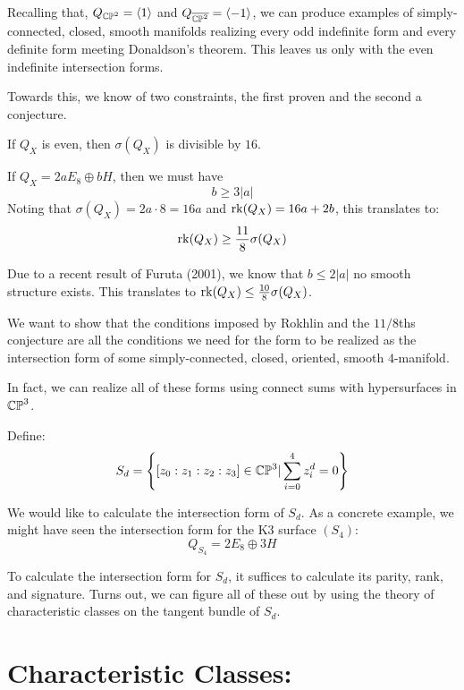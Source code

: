 \documentclass[12pt]{article}
\begin{document}
Recalling that, $Q_{\mathbb{CP}^2} = \langle 1 \rangle$ and $Q_{\overline{\mathbb{CP}^2}} = \langle -1 \rangle$, we can produce examples of simply-connected, closed, smooth manifolds realizing every odd indefinite form and every definite form meeting Donaldson's theorem. This leaves us only with the even indefinite intersection forms. 

Towards this, we know of two constraints, the first proven and the second a conjecture. 
\begin{theorem}[Rokhlin, '52]
    If $Q_X$ is even, then $\sigma(Q_X)$ is divisible by $16$.
\end{theorem}

\begin{theorem}[11/8-Conjecture]
    If $Q_X = 2aE_8 \oplus bH$, then we must have 
    \[ b \geq 3|a| \]
    Noting that $\sigma(Q_X) = 2a \cdot 8 = 16a$ and $\operatorname{rk}(Q_X) = 16a + 2b$, this translates to:
    \[ \operatorname{rk}(Q_X) \geq \frac{11}{8} \sigma(Q_X)\]
\end{theorem}
\begin{remark}
    Due to a recent result of Furuta (2001), we know that $b \leq 2|a|$ no smooth structure exists. This translates to $\operatorname{rk}(Q_X) \leq \frac{10}{8}\sigma(Q_X)$. 
\end{remark}

We want to show that the conditions imposed by Rokhlin and the $11/8$ths conjecture are all the conditions we need for the form to be realized as the intersection form of some simply-connected, closed, oriented, smooth $4$-manifold. 

In fact, we can realize all of these forms using connect sums with hypersurfaces in $\mathbb{CP}^3$. 

Define:
    \[ S_d = \left\{ [z_0 : z_1 : z_2 : z_3] \in \mathbb C\mathbb P^3 | \sum_{i=0}^4 z_i^d = 0\right\}\]

We would like to calculate the intersection form of $S_d$. As a concrete example, we might have seen the intersection form for the K3 surface $(S_4)$: 
\[ Q_{S_4} = 2E_8 \oplus 3H\]

To calculate the intersection form for $S_d$, it suffices to calculate its parity, rank, and signature. Turns out, we can figure all of these out by using the theory of characteristic classes on the tangent bundle of $S_d$. 

\section{Characteristic Classes:}
\end{document}
